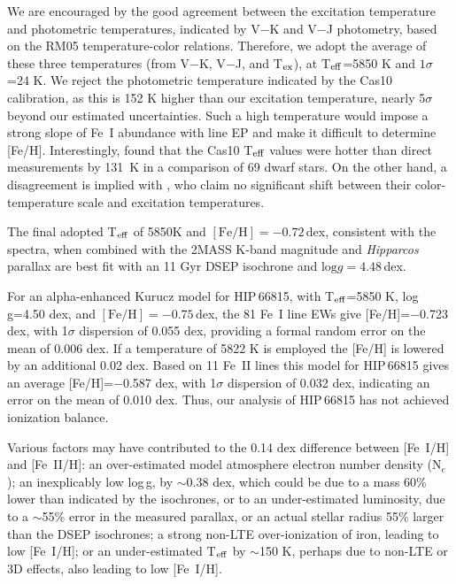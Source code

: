 \documentclass[revtex4]{emulateapj}
\begin{document}
We are encouraged by the good agreement between the excitation temperature and photometric temperatures, indicated by V$-$K and V$-$J photometry, based on the RM05 temperature-color relations. Therefore, we adopt the average of these three temperatures (from V$-$K, V$-$J, and T$_{\rm ex}$), at T$_{\rm eff}$=5850 K and $1\sigma$=24 K.  We reject the photometric temperature indicated by the Cas10 calibration, as this is 152 K higher than our excitation temperature, nearly 5$\sigma$ beyond our estimated uncertainties.  Such a high temperature would impose a strong slope of Fe~I abundance with line EP and make it difficult to determine [Fe/H].  Interestingly, \citet{Huang2015} found that the Cas10 T$_{\rm eff}$ values were hotter than direct measurements by 131~K in a comparison of 69 dwarf stars.  On the other hand, a disagreement is implied with \citet{Cas2011}, who claim no significant shift between their color-temperature scale and excitation temperatures.

The final adopted T$_{\rm eff}$ of 5850K and $\mathrm{[Fe/H]}=-0.72$\,dex, consistent with the spectra, when combined with the 2MASS K-band magnitude and \emph{Hipparcos} parallax are best fit with an 11 Gyr DSEP isochrone and $\mathrm{log }g=4.48$\,dex.

For an alpha-enhanced Kurucz model for HIP\,66815, with T$_{\rm eff}$=5850 K, log\,g=4.50 dex, and $\mathrm{[Fe/H]}=-0.75$\,dex, the 81 Fe~I line EWs give [Fe/H]=$-$0.723 dex, with 1$\sigma$ dispersion of 0.055 dex, providing a formal random error on the mean of 0.006 dex.  If a temperature of 5822 K is employed the [Fe/H] is lowered by an additional 0.02 dex.  Based on 11 Fe~II lines this model for HIP\,66815 gives an average [Fe/H]=$-$0.587 dex, with 1$\sigma$ dispersion of 0.032 dex, indicating an error on the mean of 0.010 dex.  Thus, our analysis of HIP\,66815 has not achieved ionization balance.  

Various factors may have contributed to the 0.14 dex difference between [Fe~I/H] and [Fe~II/H]: an over-estimated model atmosphere electron number density (N$_e$); an inexplicably low log\,g, by $\sim$0.38 dex, which could be due to a mass 60\% lower than indicated by the isochrones, or to an under-estimated luminosity, due to a $\sim$55\% error in the measured parallax, or an actual stellar radius 55\% larger than the DSEP isochrones; a strong non-LTE over-ionization of iron, leading to low [Fe~I/H]; or an under-estimated T$_{\rm eff}$ by $\sim$150 K, perhaps due to non-LTE or 3D effects, also leading to low [Fe~I/H].
\end{document}
